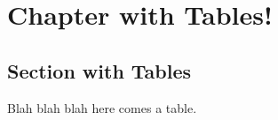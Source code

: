 \chapter{Chapter with Tables!} \label{chap:chapter3}

\section{Section with Tables}

Blah blah blah here comes a table.

\afterpage{}


